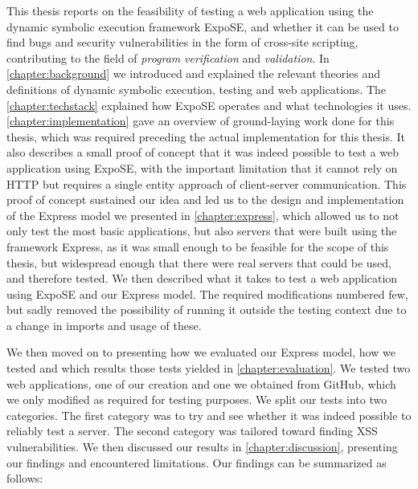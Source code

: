 This thesis reports on the feasibility of testing a web application using the dynamic symbolic execution framework ExpoSE, 
and whether it can be used to find bugs and security vulnerabilities in the form of cross-site scripting, contributing to the field of \textit{program} \textit{verification} and \textit{validation}.
In \autoref{chapter:background} we introduced and explained the relevant theories and definitions of dynamic symbolic execution, testing and web applications.
The \autoref{chapter:techstack} explained how ExpoSE operates and what technologies it uses.
\autoref{chapter:implementation} gave an overview of ground-laying work done for this thesis, which was required preceding the actual implementation for this thesis.
It also describes a small proof of concept that it was indeed possible to test a web application using ExpoSE, with the important limitation that it cannot rely on HTTP but requires a single entity approach of client-server communication.
This proof of concept sustained our idea and led us to the design and implementation of the Express model we presented in \autoref{chapter:express}, which allowed us to not only test the most basic applications,
but also servers that were built using the framework Express, as it was small enough to be feasible for the scope of this thesis, but widespread enough that 
there were real servers that could be used, and therefore tested. We then described what it takes to test a web application using ExpoSE and our Express model. The required modifications numbered few, but sadly removed the possibility of running it outside the testing context due to a change in imports and usage of these.


We then moved on to presenting how we evaluated our Express model, how we tested and which results those tests yielded in \autoref{chapter:evaluation}. We tested two web applications, one of our creation and one we obtained from GitHub, which we only modified as required for testing purposes. We split our tests into two categories. The first category was to try and see whether it was indeed possible to reliably test a server. The second category was tailored toward finding XSS vulnerabilities.
We then discussed our results in \autoref{chapter:discussion}, presenting our findings and encountered limitations. Our findings can be summarized as follows:

